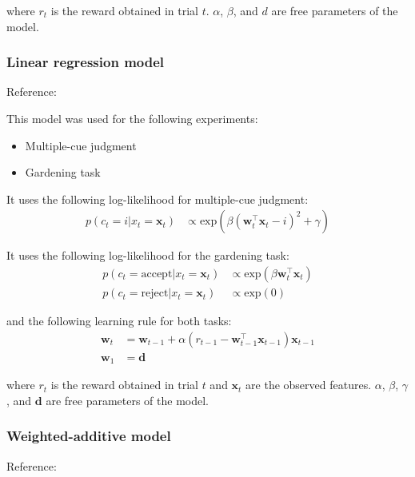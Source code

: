 \documentclass[pdflatex,sn-nature]{sn-jnl}%
\theoremstyle{thmstyleone}%
\theoremstyle{thmstyletwo}%
\theoremstyle{thmstylethree}%
\begin{document}
\noindent where $r_t$ is the reward obtained in trial $t$. $\alpha$, $\beta$, and $d$ are free parameters of the model.

\subsubsection*{Linear regression model}

Reference: \cite{gershman2015unifying} 

\noindent This model was used for the following experiments:
\begin{itemize}
    \item Multiple-cue judgment
    \item Gardening task
\end{itemize}

\noindent It uses the following log-likelihood for multiple-cue judgment:
\begin{align*}
    p(c_t = i | x_t = \mathbf{x}_t) &\propto 
        \text{exp}\left( \beta \left( \mathbf{w}_{t}^{\top}\mathbf{x}_{t} - i\right)^2 + \gamma \right) 
\end{align*}

\noindent It uses the following log-likelihood for the gardening task:
\begin{align*}
    p(c_t = \text{accept} | x_t = \mathbf{x}_t) &\propto \text{exp}\left( \beta  \mathbf{w}_{t}^{\top}\mathbf{x}_{t} \right) \\
    p(c_t = \text{reject} | x_t = \mathbf{x}_t) &\propto \text{exp}\left( 0 \right)
\end{align*}

\noindent and the following learning rule for both tasks:
\begin{align*}
    \mathbf{w}_t &= \mathbf{w}_{t-1} + \alpha \left( r_{t-1} - \mathbf{w}_{t-1}^{\top}\mathbf{x}_{t-1}\right) \mathbf{x}_{t-1} \\
    \mathbf{w}_1 &= \mathbf{d}
\end{align*}

\noindent where $r_t$ is the reward obtained in trial $t$ and $\mathbf{x}_t$ are the observed features. $\alpha$, $\beta$, $\gamma$, and $\mathbf{d}$ are free parameters of the model.

\subsubsection*{Weighted-additive model}

Reference: \cite{czerlinski1999good} 
\end{document}
